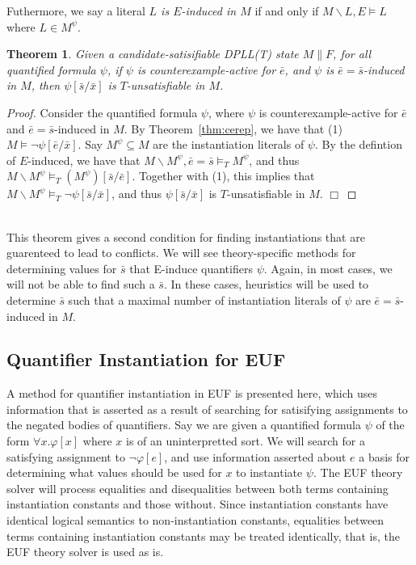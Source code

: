 \documentclass{llncs}
\newtheorem{thm}{Theorem}
\begin{document}
Futhermore, we say a literal \emph{$L$ is $E$-induced in $M$} if and only if $M \backslash L, E \models L$ where $L \in M^\psi$.

\begin{thm}
\label{thm:einduce}
Given a candidate-satisifiable DPLL(T) state $M \parallel F$, for all quantified formula $\psi$, if $\psi$ is counterexample-active for $\bar{e}$, and $\psi$ is $\bar{e} = \bar{s}$-induced in $M$, then $\psi[\bar{s}/\bar{x}]$ is $T$-unsatisfiable in $M$.
\end{thm}
\begin{proof}
Consider the quantified formula $\psi$, where $\psi$ is counterexample-active for $\bar{e}$ and $\bar{e}=\bar{s}$-induced in $M$.
By Theorem~\ref{thm:cerep}, we have that (1) $M \models \neg \psi[\bar{e}/\bar{x}]$.
Say $M^\psi \subseteq M$ are the instantiation literals of $\psi$.
By the defintion of $E$-induced, we have that $M \backslash M^\psi, \bar{e}=\bar{s} \models_T M^\psi$, and thus $M \backslash M^\psi \models_T (M^\psi)[\bar{s}/\bar{e}]$.
Together with (1), this implies that $M \backslash M^\psi \models_T \neg \psi[\bar{s}/\bar{x}]$, and thus $\psi[\bar{s}/\bar{x}]$ is $T$-unsatisfiable in $M$.
$\Box$
\end{proof}

\ \\ 

This theorem gives a second condition for finding instantiations that are guarenteed to lead to conflicts.
We will see theory-specific methods for determining values for $\bar{s}$ that E-induce quantifiers $\psi$.
Again, in most cases, we will not be able to find such a $\bar{s}$.
In these cases, heuristics will be used to determine $\bar{s}$ such that a maximal number of instantiation literals of $\psi$ are $\bar{e} = \bar{s}$-induced in $M$.

\subsection{Quantifier Instantiation for EUF}

A method for quantifier instantiation in EUF is presented here, which uses information that is asserted as a result of searching for satisifying assignments to the negated bodies of quantifiers.
Say we are given a quantified formula $\psi$ of the form $\forall x. \varphi[x]$ where $x$ is of an uninterpretted sort.
We will search for a satisfying assignment to $\neg \varphi[e]$, and use information asserted about $e$ a basis for determining what values should be used for $x$ to instantiate $\psi$.
The EUF theory solver will process equalities and disequalities between both terms containing instantiation constants and those without.
Since instantiation constants have identical logical semantics to non-instantiation constants, equalities between terms containing instantiation constants may be treated identically, that is, the EUF theory solver is used as is.
\end{document}
